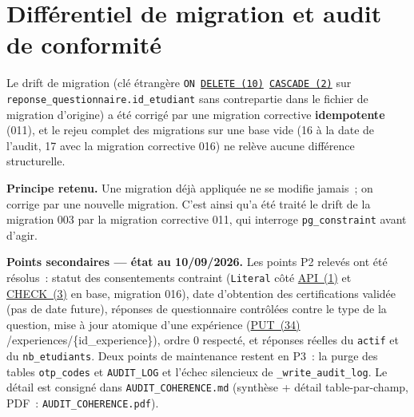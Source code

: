 \documentclass[12pt,a4paper]{report}
\begin{document}
\chapter{Différentiel de migration et audit de conformité}

Le drift de migration (clé étrangère \texttt{ON \hyperlink{abbr-DELETE}{DELETE~(10)} \hyperlink{abbr-CASCADE}{CASCADE~(2)}} sur \texttt{reponse\_questionnaire.id\_etudiant} sans contrepartie dans le fichier de migration d'origine) a été corrigé par une migration corrective \textbf{idempotente} (011), et le rejeu complet des migrations sur une base vide (16 à la date de l'audit, 17 avec la migration corrective 016) ne relève aucune différence structurelle.

\textbf{Principe retenu.} Une migration déjà appliquée ne se modifie jamais~; on corrige par une nouvelle migration. C'est ainsi qu'a été traité le drift de la migration 003 par la migration corrective 011, qui interroge \texttt{pg\_constraint} avant d'agir.

\textbf{Points secondaires — état au 10/09/2026.} Les points P2 relevés ont été résolus~: statut des consentements contraint (\texttt{Literal} côté \hyperlink{abbr-API}{API~(1)} et \hyperlink{abbr-CHECK}{CHECK~(3)} en base, migration 016), date d'obtention des certifications validée (pas de date future), réponses de questionnaire contrôlées contre le type de la question, mise à jour atomique d'une expérience (\hyperlink{abbr-PUT}{PUT~(34)} /experiences/\{id\_experience\}), ordre 0 respecté, et réponses réelles du \texttt{actif} et du \texttt{nb\_etudiants}. Deux points de maintenance restent en P3~: la purge des tables \texttt{otp\_codes} et \texttt{AUDIT\_LOG} et l'échec silencieux de \texttt{\_write\_audit\_log}. Le détail est consigné dans \texttt{AUDIT\_COHERENCE.md} (synthèse + détail table-par-champ, PDF~: \texttt{AUDIT\_COHERENCE.pdf}).
\end{document}
